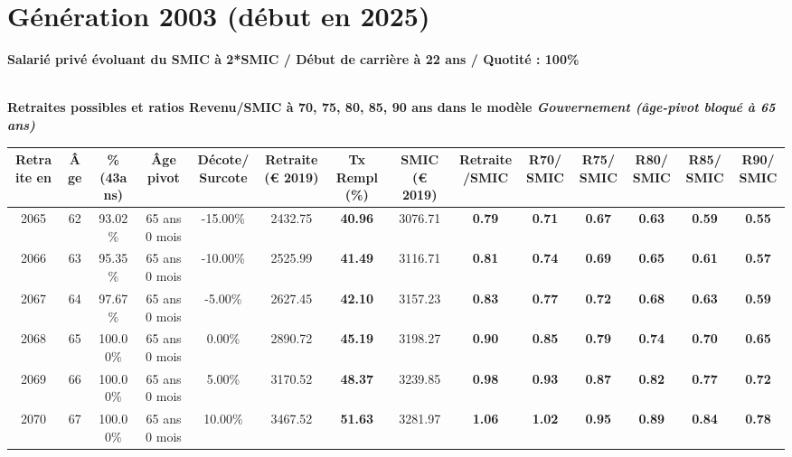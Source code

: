 \newpage 
 
\section{Génération 2003 (début en 2025)\label{Ascendant12_100_2003_22_0}} 
 
{\bf \noindent Salarié privé évoluant du SMIC à 2*SMIC / Début de carrière à 22 ans / Quotité : 100\%}  ~ 

 ~\\{\bf \noindent Retraites possibles et ratios Revenu/SMIC à 70, 75, 80, 85, 90 ans dans le modèle \emph{Gouvernement (âge-pivot bloqué à 65 ans)}}  
 
\begin{adjustbox}{max width=\textwidth} 
\begin{tabular}[htb]{|c|c||c|c|c||c|c||c|c||c|c|c|c|c|} 
\hline 
 Retraite en &  Âge &  \%(43ans) &  Âge pivot &  Décote/Surcote &  Retraite (\euro{} 2019) &  Tx Rempl(\%) &  SMIC (\euro{} 2019) &  Retraite/SMIC &  R70/SMIC &  R75/SMIC &  R80/SMIC &  R85/SMIC &  R90/SMIC \\ 
\hline \hline 
 2065 &  62 &  93.02\% &  65 ans 0 mois &  -15.00\% &  2432.75 &  {\bf 40.96} &  3076.71 &  {\bf {\color{red} 0.79}} &  {\bf {\color{red} 0.71}} &  {\bf {\color{red} 0.67}} &  {\bf {\color{red} 0.63}} &  {\bf {\color{red} 0.59}} &  {\bf {\color{red} 0.55}} \\ 
\hline 
 2066 &  63 &  95.35\% &  65 ans 0 mois &  -10.00\% &  2525.99 &  {\bf 41.49} &  3116.71 &  {\bf {\color{red} 0.81}} &  {\bf {\color{red} 0.74}} &  {\bf {\color{red} 0.69}} &  {\bf {\color{red} 0.65}} &  {\bf {\color{red} 0.61}} &  {\bf {\color{red} 0.57}} \\ 
\hline 
 2067 &  64 &  97.67\% &  65 ans 0 mois &  -5.00\% &  2627.45 &  {\bf 42.10} &  3157.23 &  {\bf {\color{red} 0.83}} &  {\bf {\color{red} 0.77}} &  {\bf {\color{red} 0.72}} &  {\bf {\color{red} 0.68}} &  {\bf {\color{red} 0.63}} &  {\bf {\color{red} 0.59}} \\ 
\hline 
 2068 &  65 &  100.00\% &  65 ans 0 mois &  0.00\% &  2890.72 &  {\bf 45.19} &  3198.27 &  {\bf {\color{red} 0.90}} &  {\bf {\color{red} 0.85}} &  {\bf {\color{red} 0.79}} &  {\bf {\color{red} 0.74}} &  {\bf {\color{red} 0.70}} &  {\bf {\color{red} 0.65}} \\ 
\hline 
 2069 &  66 &  100.00\% &  65 ans 0 mois &  5.00\% &  3170.52 &  {\bf 48.37} &  3239.85 &  {\bf {\color{red} 0.98}} &  {\bf {\color{red} 0.93}} &  {\bf {\color{red} 0.87}} &  {\bf {\color{red} 0.82}} &  {\bf {\color{red} 0.77}} &  {\bf {\color{red} 0.72}} \\ 
\hline 
 2070 &  67 &  100.00\% &  65 ans 0 mois &  10.00\% &  3467.52 &  {\bf 51.63} &  3281.97 &  {\bf 1.06} &  {\bf 1.02} &  {\bf {\color{red} 0.95}} &  {\bf {\color{red} 0.89}} &  {\bf {\color{red} 0.84}} &  {\bf {\color{red} 0.78}} \\ 
\hline 
\hline 
\end{tabular} 
\end{adjustbox} 
 
